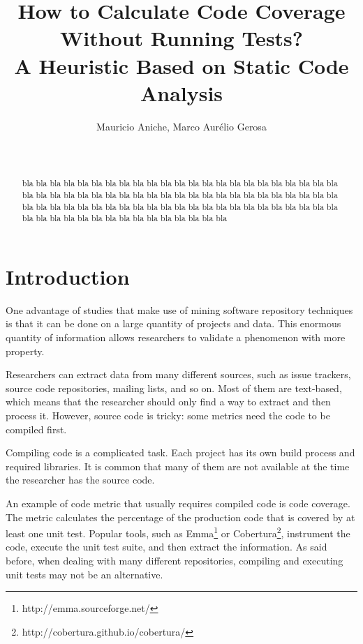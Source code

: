 \documentclass{sig-alternate}
\begin{document}

\title{How to Calculate Code Coverage Without Running Tests?\\
A Heuristic Based on Static Code Analysis}


\author{
\alignauthor
Mauricio Aniche, Marco Aurélio Gerosa\\
\\
\\
}

\maketitle
\begin{abstract}

bla bla bla bla bla bla bla bla bla bla bla bla bla bla bla bla bla bla bla bla bla bla bla bla
bla bla bla bla bla bla bla bla bla bla bla bla
bla bla bla bla bla bla bla bla bla bla bla bla
bla bla bla bla bla bla bla bla bla bla bla bla
bla bla bla bla bla bla bla bla bla bla bla bla
bla bla bla bla bla bla bla bla bla bla bla bla


\end{abstract}

\section{Introduction}

One advantage of studies that make use of mining software repository techniques
is that it can be done on a large quantity of projects and data. This enormous 
quantity of information allows researchers to validate a phenomenon with more
property.

Researchers can extract data from many different sources, such as issue trackers,
source code repositories, mailing lists, and so on. Most of them are text-based, which
means that the researcher should only find a way to extract and then process it. 
However, source code is tricky: some metrics need the code to be compiled first.

Compiling code is a complicated task. Each project has its own build process and
required libraries. It is common that many of them are not available at the time the
researcher has the source code.

An example of code metric that usually requires compiled code is code coverage. 
The metric calculates the percentage of the production code that is covered by at least
one unit test. Popular tools, such as Emma\footnote{http://emma.sourceforge.net/} or
Cobertura\footnote{http://cobertura.github.io/cobertura/}, instrument the code, execute
the unit test suite, and then extract the information. As said before, when dealing
with many different repositories, compiling and executing unit tests may not be
an alternative.
\end{document}
